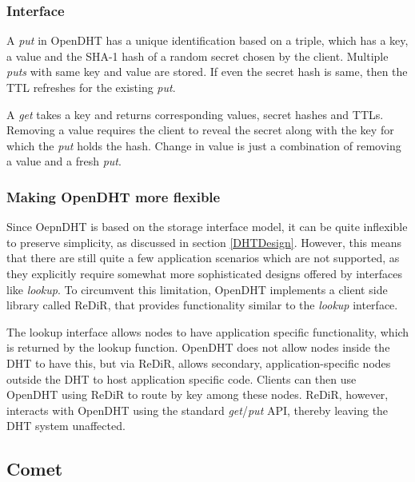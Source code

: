 \documentclass[11pt,a4paper]{article}
\begin{document}
    
    \subsubsection{Interface}
    
    A \textit{put} in OpenDHT has a unique identification based on a triple, which has a key, a value and the SHA-1 hash of a random secret chosen by the client. Multiple \textit{puts} with same key and value are stored. If even the secret hash is same, then the TTL refreshes for the existing \textit{put}.
    
    A \textit{get} takes a key and returns corresponding values, secret hashes and TTLs. Removing a value requires the client to reveal the secret along with the key for which the \textit{put} holds the hash. Change in value is just a combination of removing a value and a fresh \textit{put}.
    
    
    \subsubsection{Making OpenDHT more flexible}
    
    Since OepnDHT is based on the storage interface model, it can be quite inflexible to preserve simplicity, as discussed in section \ref{DHTDesign}. However, this means that there are still quite a few application scenarios which are not supported, as they explicitly require somewhat more sophisticated designs offered by interfaces like \textit{lookup}. To circumvent this limitation, OpenDHT implements a client side library called ReDiR, that provides functionality similar to the \textit{lookup} interface.
    
    The lookup interface allows nodes to have application specific functionality, which is returned by the lookup function. OpenDHT does not allow nodes inside the DHT to have this, but via ReDiR, allows secondary, application-specific nodes outside the DHT to host application specific code. Clients can then use OpenDHT using ReDiR to route by key among these nodes. ReDiR, however, interacts with OpenDHT using the standard \textit{get}/\textit{put} API, thereby leaving the DHT system unaffected.
    
    \subsection{Comet} \label{comet}
    
\end{document}
